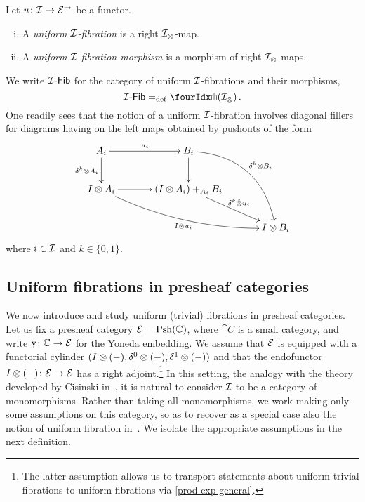 \documentclass[reqno,10pt,a4paper,oneside,draft]{amsart}
\begin{document}
\begin{definition} \label{def:I-fibration}
Let $u \co \cal{I} \to \catE^\to$ be a functor.
\begin{enumerate}[(i)]
\item A \emph{uniform $\cal{I}$-fibration} is a right $\cal{I}_\otimes$-map.
\item A \emph{uniform $\cal{I}$-fibration morphism} is a morphism of right $\cal{I}_\otimes$-maps.
\end{enumerate}
\end{definition}

We write $\Fib{\cal{I}}$ for the category of uniform $\cal{I}$-fibrations and their morphisms, \ie
\[
  \Fib{\cal{I}} \defeq \liftr{(\cal{I}_\otimes)} \, .
\]
One readily sees that the notion of a uniform $\cal{I}$-fibration involves diagonal fillers for diagrams having on the left maps obtained by pushouts of the form
\begin{gather*}
\xymatrix@C=1.2cm{
  A_i
  \ar[r]^{u_i}
  \ar[d]_{\kcyl \otimes A_i}
&
  B_i
  \ar@/^2pc/[ddr]^{\kcyl \otimes B_i}
  \ar[d]
&\\
  \interval \otimes A_i
  \ar@/_1pc/[drr]_{\interval \otimes u_i}
  \ar[r]
&
  (\interval \otimes A_i) +_{A_i} B_i
  \ar[dr]^-{\delta^k \hatotimes u_i}
&\\&&
  \interval \otimes B_i
\rlap{.}}
\end{gather*}
where $i \in \cal{I}$ and $k \in \{0, 1 \}$.


\subsection*{Uniform fibrations in presheaf categories} 


We now introduce and study  uniform  (trivial) fibrations  in presheaf categories. Let us fix a presheaf category $\catE = \Psh(\cat{C})$, where $\cat{C}$ is a small category, and
write $\yon \co \catC \to \catE$ for the Yoneda embedding. We assume that $\catE$ is equipped with a functorial cylinder $( \interval \otimes (-), \lcyl \otimes (-), \rcyl \otimes (-))$ and that the endofunctor $ \interval\otimes (-) \co \catE \to \catE$ has a right adjoint.\footnote{The latter assumption allows us to transport statements about uniform trivial fibrations to uniform fibrations via \cref{prod-exp-general}.}
In this setting, the analogy with the theory developed by Cisinski in~\cite{cisinski-asterisque}, it is 
natural to consider $\cal{I}$ to be a category of monomorphisms. Rather than taking all monomorphisms, we work making only some assumptions on this category, so as to recover
as a special case also the notion of uniform fibration in~\cite{cohen-et-al:cubicaltt}. 
We isolate the appropriate assumptions in the next definition.
\end{document}
